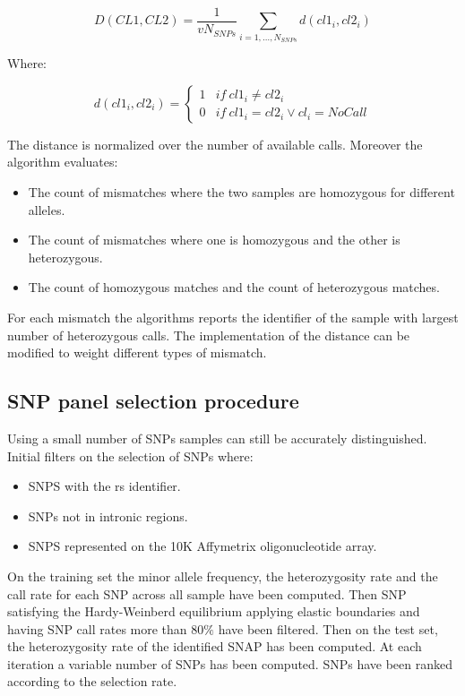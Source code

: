 	$$D(CL1, CL2) = \frac{1}{vN_{SNPs}}\sum\limits_{i=1, \dots, N_{SNPs}}d(cl1_i, cl2_i)$$

	Where:

	$$d(cl1_i, cl2_i) = \begin{cases} 1 &if\ cl1_i\neq cl2_i\\ 0 &if\ cl1_i = cl2_i\lor cl_i = NoCall\end{cases}$$

	The distance is normalized over the number of available calls.
	Moreover the algorithm evaluates:

	\begin{multicols}{2}
		\begin{itemize}
			\item The count of mismatches where the two samples are homozygous for different alleles.
			\item The count of mismatches where one is homozygous and the other is heterozygous.
			\item The count of homozygous matches and the count of heterozygous matches.
		\end{itemize}
	\end{multicols}

	For each mismatch the algorithms reports the identifier of the sample with largest number of heterozygous calls.
	The implementation of the distance can be modified to weight different types of mismatch.

	\subsection{SNP panel selection procedure}
	Using a small number of SNPs samples can still be accurately distinguished.
	Initial filters on the selection of SNPs where:

	\begin{multicols}{2}
		\begin{itemize}
			\item SNPS with the rs identifier.
			\item SNPs not in intronic regions.
			\item SNPS represented on the 10K Affymetrix oligonucleotide array.
		\end{itemize}
	\end{multicols}

	On the training set the minor allele frequency, the heterozygosity rate and the call rate for each SNP across all sample have been computed.
	Then SNP satisfying the Hardy-Weinberd equilibrium applying elastic boundaries and having SNP call rates more than $80\%$ have been filtered.
	Then on the test set, the heterozygosity rate of the identified SNAP has been computed.
	At each iteration a variable number of SNPs has been computed.
	SNPs have been ranked according to the selection rate.

